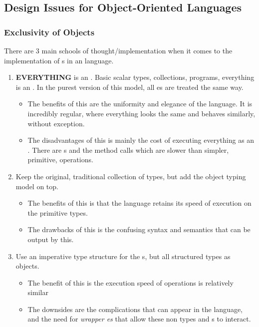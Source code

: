 \subsection{Design Issues for Object-Oriented Languages}\label{subsec:OOP_Design_Issues}
\subsubsection{Exclusivity of Objects}\label{subsubsec:OOP_Object_Exclusivity}
There are 3 main schools of thought/implementation when it comes to the implementation of s in an  language.
\begin{enumerate}[noitemsep]
\item \textbf{EVERYTHING} is an . Basic scalar types, collections, programs, everything is an . In the purest version of this model, all es are treated the same way.
  \begin{itemize}[noitemsep]
  \item The benefits of this are the uniformity and elegance of the language. It is incredibly regular, where everything looks the same and behaves similarly, without exception.
  \item The disadvantages of this is mainly the cost of executing everything as an . There are s and the method calls which are slower than simpler, primitive, operations.
  \end{itemize}
\item Keep the original, traditional collection of types, but add the object typing model on top.
  \begin{itemize}[noitemsep]
  \item The benefits of this is that the language retains its speed of execution on the primitive types.
  \item The drawbacks of this is the confusing syntax and semantics that can be output by this.
  \end{itemize}
\item Use an imperative type structure for the s, but all structured types as objects.
  \begin{itemize}[noitemsep]
  \item The benefit of this is the execution speed of operations is relatively similar
  \item The downsides are the complications that can appear in the language, and the need for \emph{wrapper es} that allow these non types and s to interact.
  \end{itemize}
\end{enumerate}

